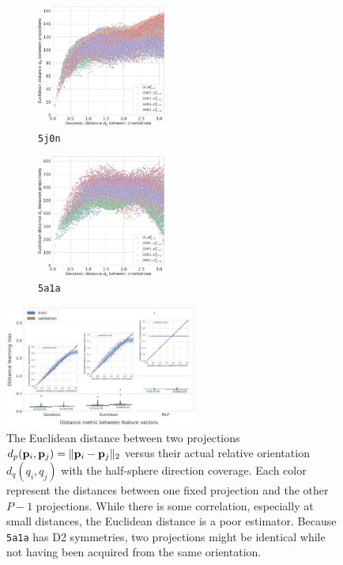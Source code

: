 \begin{figure}[ht!]
    \begin{minipage}[t]{0.55\linewidth}
        \begin{subfigure}[t]{0.48\textwidth}
            \centering
            \includegraphics[height=4cm]{figures/eucl_notrobust_5j0n}
            \caption{\texttt{5j0n}}
        \end{subfigure}
        \hfill
        \begin{subfigure}[t]{0.48\textwidth}
            \centering
            \includegraphics[height=4cm]{figures/eucl_notrobust_5a1a}
            \caption{\texttt{5a1a}}\label{fig:euclidean-not-robust:5a1a}
        \end{subfigure}
        \caption{%
            The Euclidean distance between two projections $d_p(\mathbf{p}_i, \mathbf{p}_j) = \Vert \mathbf{p}_i - \mathbf{p}_j \Vert_2$ versus their actual relative orientation $d_q(q_i, q_j)$ with the half-sphere direction coverage.
            Each color represent the distances between one fixed projection and the other $P-1$ projections.
            While there is some correlation, especially at small distances, the Euclidean distance is a poor estimator.
            Because \texttt{5a1a} has D2 symmetries, two projections might be identical while not having been acquired from the same orientation.
        }\label{fig:euclidean-not-robust}
    \end{minipage}
    \hfill
    \begin{minipage}[t]{0.4\linewidth}
        \centering
        \includegraphics[height=4cm]{figures/geo_eucl_mlp_distance_metric.pdf}

\end{minipage}
\end{figure}
